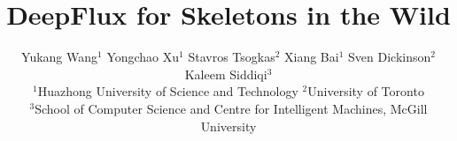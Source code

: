 \documentclass[10pt,twocolumn,letterpaper]{article}
\begin{document}
\title{DeepFlux for Skeletons in the Wild}

\author{
Yukang Wang$^1$ \quad Yongchao Xu$^1$ \quad Stavros Tsogkas$^2$ \quad Xiang Bai$^1$ \quad Sven Dickinson$^2$ \quad Kaleem Siddiqi$^3$
\\[0.2cm]
$^1$Huazhong University of Science and Technology
\quad
$^2$University of Toronto
\\
$^3$School of Computer Science and Centre for Intelligent Machines, McGill University
}

\maketitle
\end{document}
